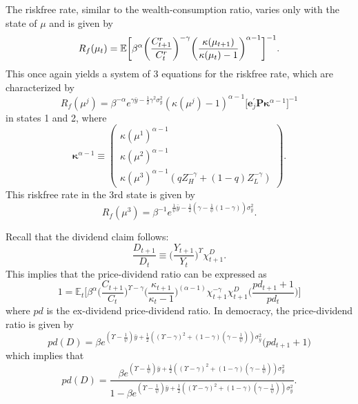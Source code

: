 The riskfree rate, similar to the wealth-consumption ratio, varies only with the state of $\mu$ and is given by
\begin{align*}
R_{f}(\mu_t) = \mathbb{E}\bigg[\beta^{\alpha}\bigg(\frac{C^r_{t+1}}{C^r_{t}}\bigg)^{-\gamma}\bigg(\frac{\kappa(\mu_{t+1})}{\kappa(\mu_{t})-1}\bigg)^{\alpha-1}\bigg]^{-1}.
\end{align*}
This once again yields a system of 3 equations for the riskfree rate, which are characterized by
\begin{equation}
R_{f}(\mu^{j})= \beta^{-\alpha}e^{\gamma\bar{y} -\frac{1}{2}\gamma^2 \sigma_y^2}\left(\kappa(\mu^{j})-1\right)^{\alpha-1}\bigg[\mathbf{e}_j^\prime \mathbf{P}\boldsymbol\kappa^{\alpha-1}\bigg]^{-1}
\end{equation}
in states 1 and 2, where
\begin{equation}
\boldsymbol{\kappa}^{\alpha-1}\equiv\begin{pmatrix}\kappa(\mu^{1})^{\alpha-1}\\
\kappa(\mu^{2})^{\alpha-1}\\
\kappa(\mu^{3})^{\alpha-1}(qZ_H^{-\gamma} + (1-q)Z_L^{-\gamma})
\end{pmatrix}.
\end{equation}
This riskfree rate in the 3rd state is given by
\begin{equation*}
R_{f}(\mu^3)= \beta^{-1}e^{\frac{1}{\psi}\bar{y} - \frac{1}{2}(\gamma-\frac{1}{\psi}(1-\gamma))\sigma_y^2}.
\end{equation*}

Recall that the dividend claim follows:
\begin{equation*}
\frac{D_{t+1}}{D_{t}} \equiv \bigg(\frac{Y_{t+1}}{Y_{t}}\bigg)^{\Upsilon}\chi^D_{t+1}.
\end{equation*}
This implies that the price-dividend ratio can be expressed as
\begin{equation}
1=\mathbb{E}_t\bigg[\beta^{\alpha}\bigg(\frac{C_{t+1}}{C_{t}}\bigg)^{\Upsilon-\gamma}\bigg(\frac{\kappa_{t+1}}{\kappa_t - 1}\bigg)^{(\alpha-1)} \chi^{-\gamma}_{t+1}\chi^D_{t+1} \bigg(\frac{pd_{t+1}+1}{pd_{t}}\bigg)\bigg]
\end{equation}
where $pd$ is the ex-dividend price-dividend ratio. In democracy, the price-dividend ratio is given by
\begin{equation}
pd(D) = \beta e^{(\Upsilon-\frac{1}{\psi})\bar{y}+\frac{1}{2}((\Upsilon-\gamma)^2 + (1-\gamma)(\gamma-\frac{1}{\psi}))\sigma_y^{2}} \bigg(pd_{t+1}+1\bigg)
\end{equation}
which implies that 
\begin{equation}
pd(D) = \frac{\beta e^{(\Upsilon-\frac{1}{\psi})\bar{y}+\frac{1}{2}((\Upsilon-\gamma)^2 + (1-\gamma)(\gamma-\frac{1}{\psi}))\sigma_y^{2}}}{1-\beta e^{(\Upsilon-\frac{1}{\psi})\bar{y}+\frac{1}{2}((\Upsilon-\gamma)^2 + (1-\gamma)(\gamma-\frac{1}{\psi}))\sigma_y^{2}}}.
\end{equation}

